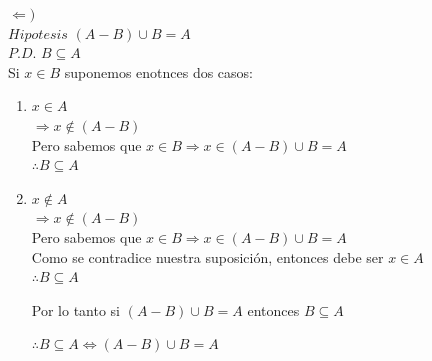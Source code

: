 \documentclass[12pt]{article}
\begin{document}
\begin{enumerate}[label=\alph*)]
    $\Longleftarrow)$\\

    $Hipotesis$ $(A - B) \cup B = A$\\

    $P.D$. $B \subseteq A$\\
    
    Si $x \in B$ suponemos enotnces dos casos:
    \begin{enumerate}[label=\roman*)]
        \item $x \in A$\\

        $\Longrightarrow x \notin (A - B)$\\

        Pero sabemos que $x \in B \Longrightarrow x \in (A - B) \cup B = A$\\

        $\therefore B \subseteq A$

        \item  $x \notin A$\\

        $\Longrightarrow x \notin (A - B)$\\

        Pero sabemos que $x \in B \Longrightarrow x \in (A - B) \cup B = A$\\

        Como se contradice nuestra suposición, entonces debe ser $x \in A$\\

        $\therefore B \subseteq A$

    Por lo tanto si $(A - B) \cup B = A$ entonces $B \subseteq A$

    $\therefore B \subseteq A \Longleftrightarrow (A - B) \cup B = A$
    \end{enumerate}
\end{enumerate}
\end{document}
